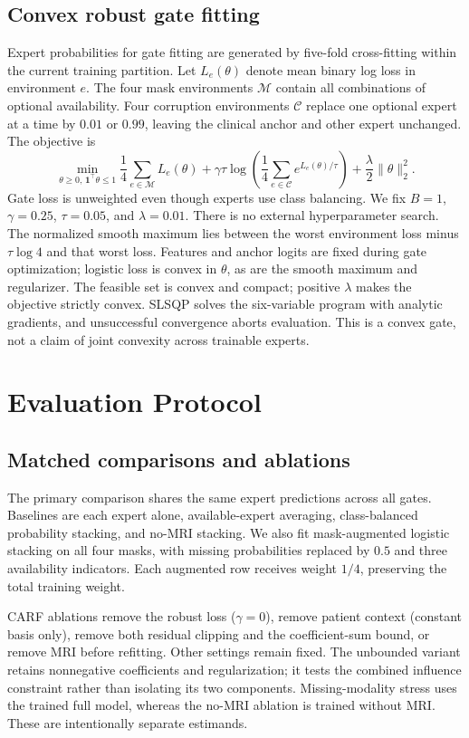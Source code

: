 \documentclass[runningheads]{llncs}
\begin{document}
\subsection{Convex robust gate fitting}
Expert probabilities for gate fitting are generated by five-fold cross-fitting within the current training partition. Let $L_e(\theta)$ denote mean binary log loss in environment $e$. The four mask environments $\mathcal M$ contain all combinations of optional availability. Four corruption environments $\mathcal C$ replace one optional expert at a time by $0.01$ or $0.99$, leaving the clinical anchor and other expert unchanged. The objective is
\begin{equation}
 \min_{\theta\geq0,\,\mathbf1^\top\theta\leq1}
 \frac1{4}\sum_{e\in\mathcal M}L_e(\theta)
 +\gamma\tau\log\left(\frac1{4}\sum_{e\in\mathcal C}e^{L_e(\theta)/\tau}\right)
 +\frac\lambda2\|\theta\|_2^2.
 \label{eq:objective}
\end{equation}
Gate loss is unweighted even though experts use class balancing. We fix $B=1$, $\gamma=0.25$, $\tau=0.05$, and $\lambda=0.01$. There is no external hyperparameter search. The normalized smooth maximum lies between the worst environment loss minus $\tau\log4$ and that worst loss. Features and anchor logits are fixed during gate optimization; logistic loss is convex in $\theta$, as are the smooth maximum and regularizer. The feasible set is convex and compact; positive $\lambda$ makes the objective strictly convex. SLSQP solves the six-variable program with analytic gradients, and unsuccessful convergence aborts evaluation. This is a convex gate, not a claim of joint convexity across trainable experts.

\section{Evaluation Protocol}
\subsection{Matched comparisons and ablations}
The primary comparison shares the same expert predictions across all gates. Baselines are each expert alone, available-expert averaging, class-balanced probability stacking, and no-MRI stacking. We also fit mask-augmented logistic stacking on all four masks, with missing probabilities replaced by $0.5$ and three availability indicators. Each augmented row receives weight $1/4$, preserving the total training weight.

CARF ablations remove the robust loss ($\gamma=0$), remove patient context (constant basis only), remove both residual clipping and the coefficient-sum bound, or remove MRI before refitting. Other settings remain fixed. The unbounded variant retains nonnegative coefficients and regularization; it tests the combined influence constraint rather than isolating its two components. Missing-modality stress uses the trained full model, whereas the no-MRI ablation is trained without MRI. These are intentionally separate estimands.
\end{document}

